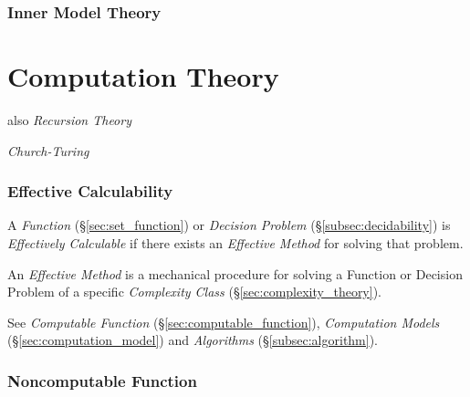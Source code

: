 \documentclass{article}
\begin{document}
\section{Inner Model Theory}\label{sec:inner_model_theory}



\part{Computation Theory}\cite{czoo14}\label{sec:recursion_theory}

also \emph{Recursion Theory}

\emph{Church-Turing}



\section{Effective Calculability}\label{sec:effective_method}

A \emph{Function} (\S\ref{sec:set_function}) or \emph{Decision
Problem} (\S\ref{subsec:decidability}) is \emph{Effectively
Calculable} if there exists an \emph{Effective Method} for solving
that problem.

An \emph{Effective Method} is a mechanical procedure for solving a
Function or Decision Problem of a specific \emph{Complexity Class}
(\S\ref{sec:complexity_theory}).

See \emph{Computable Function} (\S\ref{sec:computable_function}),
\emph{Computation Models} (\S\ref{sec:computation_model}) and
\emph{Algorithms} (\S\ref{subsec:algorithm}).



\section{Noncomputable Function}\label{sec:noncomputable_function}
\end{document}
